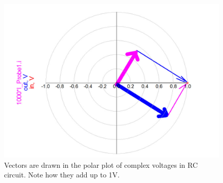 \documentclass{ximera}
\begin{document}
\begin{example}
\begin{explanation}
\begin{figure}[htbp]
\begin{center}
\includegraphics[scale=0.2]{../jpg/RCvoltPolarPlotVectors.jpg}
\end{center}
\caption{\label{f112} Vectors are drawn in the polar plot of complex voltages in RC circuit. Note how they add up to 1V.}
\end{figure}





\end{explanation}



\end{example}
\end{document}
